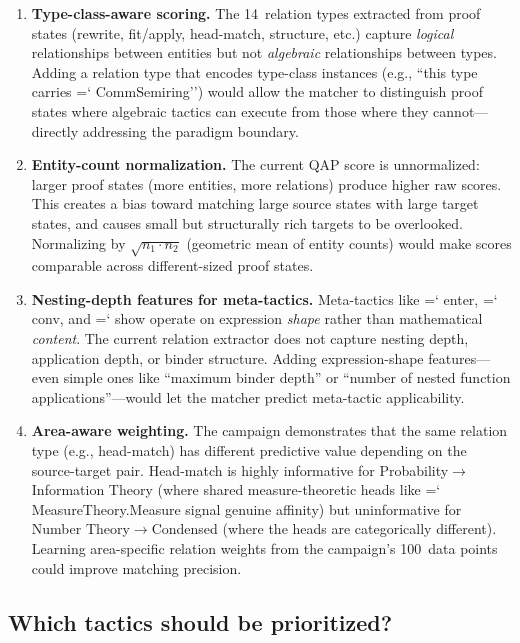 \documentclass[11pt]{article}
\renewcommand{\texttt}[1]{%
  \begingroup\ttfamily\hyphenchar\font=`\-\relax
  \def\_{\textunderscore\discretionary{}{}{}}%
  #1\endgroup}
\theoremstyle{definition}
\theoremstyle{remark}
\begin{document}
\begin{enumerate}
\item \textbf{Type-class-aware scoring.}
  The 14~relation types extracted from proof states
  (rewrite, fit/apply, head-match, structure, etc.)
  capture \emph{logical} relationships between entities but not
  \emph{algebraic} relationships between types.  Adding a relation
  type that encodes type-class instances
  (e.g., ``this type carries \texttt{CommSemiring}'') would allow
  the matcher to distinguish proof states where algebraic tactics
  can execute from those where they cannot---directly addressing
  the paradigm boundary.

\item \textbf{Entity-count normalization.}
  The current QAP score is unnormalized: larger proof states
  (more entities, more relations) produce higher raw scores.  This
  creates a bias toward matching large source states with large
  target states, and causes small but structurally rich targets to
  be overlooked.  Normalizing by $\sqrt{n_1 \cdot n_2}$ (geometric
  mean of entity counts) would make scores comparable across
  different-sized proof states.

\item \textbf{Nesting-depth features for meta-tactics.}
  Meta-tactics like \texttt{enter}, \texttt{conv}, and
  \texttt{show} operate on expression \emph{shape} rather than
  mathematical \emph{content}.  The current relation extractor does
  not capture nesting depth, application depth, or binder structure.
  Adding expression-shape features---even simple ones like
  ``maximum binder depth'' or ``number of nested function
  applications''---would let the matcher predict meta-tactic
  applicability.

\item \textbf{Area-aware weighting.}
  The campaign demonstrates that the same relation type
  (e.g., head-match) has different predictive value depending on
  the source-target pair.  Head-match is highly informative for
  Probability$\to$Information Theory (where shared measure-theoretic
  heads like \texttt{MeasureTheory.Measure} signal genuine affinity)
  but uninformative for Number Theory$\to$Condensed (where the heads
  are categorically different).  Learning area-specific relation
  weights from the campaign's 100~data points could improve matching
  precision.
\end{enumerate}

\subsection{Which tactics should be prioritized?}
\end{document}
